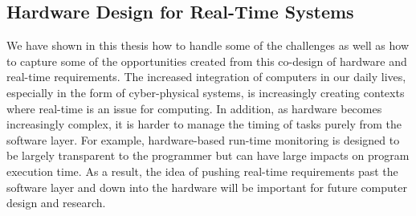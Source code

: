 \subsection{Hardware Design for Real-Time Systems}

We have shown in this thesis how to handle some of the challenges as well as
how to capture some of the opportunities created from this co-design of
hardware and real-time requirements.  The increased integration of computers in
our daily lives, especially in the form of cyber-physical systems, is
increasingly creating contexts where real-time is an issue for computing. In
addition, as hardware becomes increasingly complex, it is harder to manage the
timing of tasks purely from the software layer. For example, hardware-based
run-time monitoring is designed to be largely transparent to the programmer but
can have large impacts on program execution time. As a result, the idea of
pushing real-time requirements past the software layer and down into the
hardware will be important for future computer design and research.
